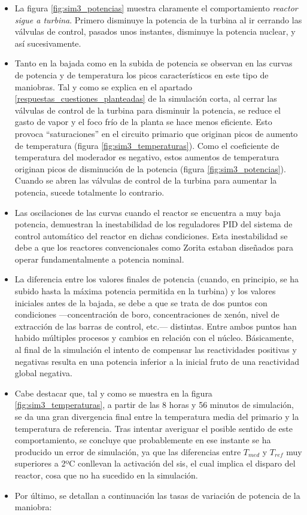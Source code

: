 \begin{itemize}
  \item La figura \ref{fig:sim3_potencias} muestra claramente el comportamiento \textit{reactor sigue a turbina}. Primero disminuye la potencia de la turbina al ir cerrando las válvulas de control, pasados unos instantes, disminuye la potencia nuclear, y así sucesivamente.
  \item Tanto en la bajada como en la subida de potencia se observan en las curvas de potencia y de temperatura los picos característicos en este tipo de maniobras. Tal y como se explica en el apartado \ref{respuestas_cuestiones_planteadas} de la simulación corta, al cerrar las válvulas de control de la turbina para disminuir la potencia, se reduce el gasto de vapor y el foco frío de la planta se hace menos eficiente. Esto provoca “saturaciones” en el circuito primario que originan picos de aumento de temperatura (figura \ref{fig:sim3_temperaturas}). Como el coeficiente de temperatura del moderador es negativo, estos aumentos de temperatura originan picos de disminución de la potencia (figura \ref{fig:sim3_potencias}). Cuando se abren las válvulas de control de la turbina para aumentar la potencia, sucede totalmente lo contrario.
  \item Las oscilaciones de las curvas cuando el reactor se encuentra a muy baja potencia, demuestran la inestabilidad de los reguladores PID del sistema de control automático del reactor en dichas condiciones. Esta inestabilidad se debe a que los reactores convencionales como Zorita estaban diseñados para operar fundamentalmente a potencia nominal.
  \item La diferencia entre los valores finales de potencia (cuando, en principio, se ha subido hasta la máxima potencia permitida en la turbina) y los valores iniciales antes de la bajada, se debe a que se trata de dos puntos con condiciones ---concentración de boro, concentraciones de xenón, nivel de extracción de las barras de control, etc.--- distintas. Entre ambos puntos han habido múltiples procesos y cambios en relación con el núcleo. Básicamente, al final de la simulación el intento de compensar las reactividades positivas y negativas resulta en una potencia inferior a la inicial fruto de una reactividad global negativa.
  \item Cabe destacar que, tal y como se muestra en la figura \ref{fig:sim3_temperaturas}, a partir de las 8 horas y 56 minutos de simulación, se da una gran divergencia final entre la temperatura media del primario y la temperatura de referencia. Tras intentar averiguar el posible sentido de este comportamiento, se concluye que probablemente en ese instante se ha producido un error de simulación, ya que las diferencias entre $T_{med}$ y $T_{ref}$ muy superiores a 2ºC conllevan la activación del \acrfull{sis}, el cual implica el disparo del reactor, cosa que no ha sucedido en la simulación. 
  \item Por último, se detallan a continuación las tasas de variación de potencia de la maniobra:
  

\end{itemize}
